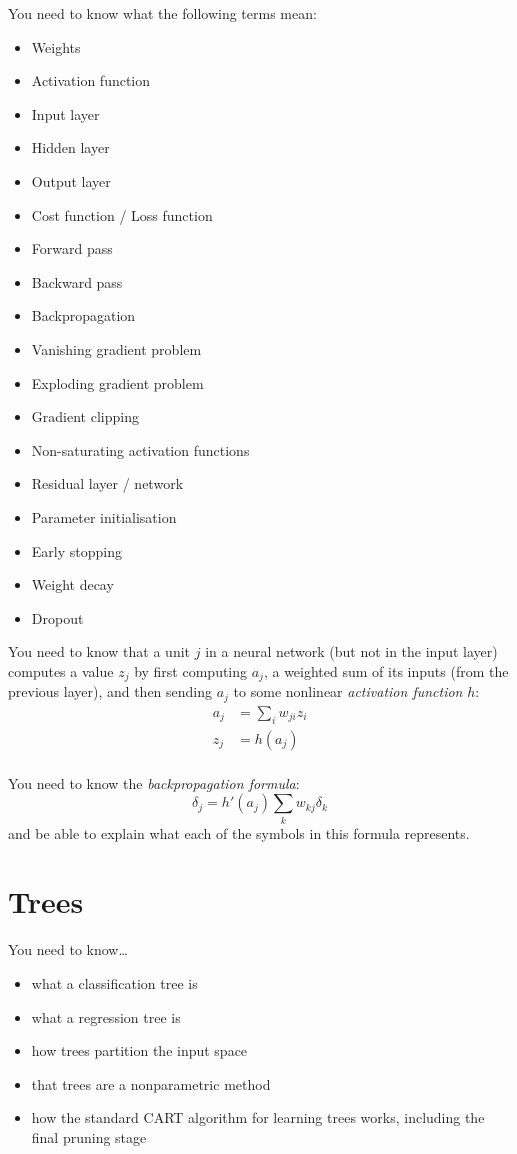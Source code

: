 \documentclass{article}
\newcommand{\yntk}{You need to know}
\begin{document}
\yntk{} what the following terms mean:
\begin{itemize}
\item Weights
\item Activation function
\item Input layer
\item Hidden layer
\item Output layer
\item Cost function / Loss function
\item Forward pass
\item Backward pass
\item Backpropagation
\item Vanishing gradient problem
\item Exploding gradient problem
\item Gradient clipping
\item Non-saturating activation functions
\item Residual layer / network
\item Parameter initialisation
\item Early stopping
\item Weight decay
\item Dropout
\end{itemize}

\yntk{} that a unit $j$ in a neural network (but not in the input
layer) computes a value $z_j$ by first computing $a_j$, a weighted sum
of its inputs (from the previous layer), and then sending $a_j$ to
some nonlinear \emph{activation function} $h$:
\begin{align}
  \label{eq:preact}
  a_{j} & = \sum_{i}w_{ji}z_{i} \\
  \label{eq:act}
  z_{j} & = h(a_{j}) \\
\end{align}

\yntk{} the \emph{backpropagation formula}:
\begin{equation}
  \label{eq:backprop}
  \delta_{j} = h'(a_{j})\sum_{k}w_{kj}\delta_{k}
\end{equation}
and be able to explain what each of the symbols in this formula represents.

\section{Trees}
\label{sec:trees}

\yntk \dots
\begin{itemize}
\item what a classification tree is
\item what a regression tree is
\item how trees partition the input space
\item that trees are a nonparametric method
\item how the standard CART algorithm for learning trees works,
  including the final pruning stage
\end{itemize}
\end{document}
